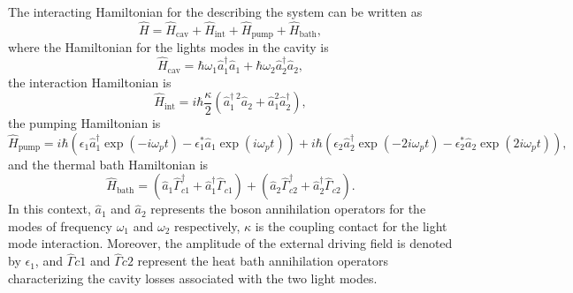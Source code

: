 \documentclass[fleqn,11pt]{wlscirep}
\begin{document}
The interacting Hamiltonian for the describing the system can be written as
\begin{equation}
	\hat{H} = \hat{H}_{\text{cav}} + \hat{H}_{\text{int}} + \hat{H}_{\text{pump}} + \hat{H}_{\text{bath}},
\end{equation}
where the Hamiltonian for the lights modes in the cavity is 
\begin{equation}
	\hat{H}_{\text{cav}} = \hbar\omega_1 \hat{a}_1^{\dagger}\hat{a}_1 +
	\hbar\omega_2 \hat{a}_2^{\dagger}\hat{a}_2,
\end{equation}
the interaction Hamiltonian is
\begin{equation}
	\hat{H}_{\text{int}} = i\hbar \frac{\kappa}{2}
	(\hat{a}_1^{\dagger\;2}\hat{a}_2 +
	\hat{a}_1^2\hat{a}_2^{\dagger}),
\end{equation}
the pumping Hamiltonian is
\begin{equation}
	\hat{H}_{\text{pump}} = 
	i\hbar(
		\epsilon_1\hat{a}_1^{\dagger}\exp(-i\omega_p t) - 
		\epsilon_1^{*}\hat{a}_1\exp(i\omega_p t)
	)
	+ i\hbar(
		\epsilon_2\hat{a}_2^{\dagger}\exp(-2i\omega_p t) - 
		\epsilon_2^{*}\hat{a}_2\exp(2i\omega_p t)
	),
\end{equation}
and the thermal bath Hamiltonian is
\begin{equation}
	\hat{H}_{\text{bath}} = 
	(\hat{a}_1 \hat{\Gamma}_{c1}^{\dagger} + \hat{a}_1^{\dagger}\hat{\Gamma}_{c1}) 
	+
	(\hat{a}_2 \hat{\Gamma}_{c2}^{\dagger} + \hat{a}_2^{\dagger}\hat{\Gamma}_{c2}).
\end{equation}
In this context, $\hat{a}_1$ and $\hat{a}_2$ represents the boson annihilation operators for the modes of frequency $\omega_1$ and $\omega_2$ respectively, $\kappa$ is the coupling contact for the light mode interaction. Moreover, the amplitude of the external driving field is denoted by $\epsilon_1$, and $\hat{\Gamma}{c1}$ and $\hat{\Gamma}{c2}$ represent the heat bath annihilation operators characterizing the cavity losses associated with the two light modes.
\end{document}
